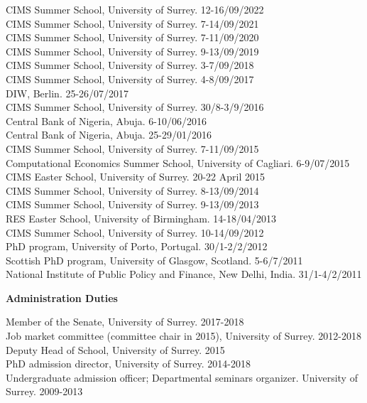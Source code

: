 \documentclass[margin, 11pt]{res} %
\begin{document}
\begin{resume}
CIMS Summer School, University of Surrey. \hfill 12-16/09/2022 \\
CIMS Summer School, University of Surrey. \hfill 7-14/09/2021 \\
CIMS Summer School, University of Surrey. \hfill 7-11/09/2020 \\
CIMS Summer School, University of Surrey. \hfill 9-13/09/2019 \\
CIMS Summer School, University of Surrey. \hfill 3-7/09/2018 \\
CIMS Summer School, University of Surrey. \hfill 4-8/09/2017\\
DIW, Berlin. \hfill 25-26/07/2017 \\
CIMS Summer School, University of Surrey. \hfill 30/8-3/9/2016\\
Central Bank of Nigeria, Abuja. \hfill 6-10/06/2016 \\
Central Bank of Nigeria, Abuja. \hfill 25-29/01/2016\\
CIMS Summer School, University of Surrey. \hfill 7-11/09/2015\\
Computational Economics Summer School, University of Cagliari. \hfill 6-9/07/2015\\
CIMS Easter School, University of Surrey. \hfill 20-22 April 2015\\
CIMS Summer School, University of Surrey. \hfill 8-13/09/2014\\
CIMS Summer School, University of Surrey. \hfill 9-13/09/2013\\
RES Easter School, University of Birmingham. \hfill 14-18/04/2013\\
CIMS Summer School, University of Surrey. \hfill 10-14/09/2012 \\
PhD program, University of Porto, Portugal. \hfill 30/1-2/2/2012\\
Scottish PhD program, University of Glasgow, Scotland. \hfill 5-6/7/2011\\
National Institute of Public Policy and Finance, New Delhi, India. \hfill 31/1-4/2/2011


\textbf{Administration Duties}

Member of the Senate, University of Surrey. \hfill 2017-2018\\
Job market committee (committee chair in 2015), University of Surrey. \hfill 2012-2018\\
Deputy Head of School, University of Surrey. \hfill 2015\\
 PhD admission director, University of Surrey. \hfill 2014-2018\\
Undergraduate admission officer; Departmental seminars organizer. University of Surrey. \hfill 2009-2013


\end{resume}
\end{document}
